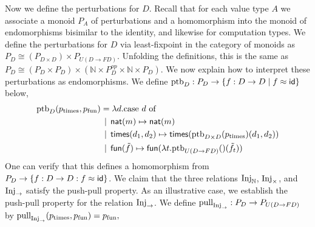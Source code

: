 Now we define the perturbations for $D$. Recall that for each value type $A$ we
associate a monoid $P_A$ of perturbations and a homomorphism into the monoid of
endomorphisms bisimilar to the identity, and likewise for computation types. We
define the perturbations for $D$ via least-fixpoint in the category of monoids
as
%
\( P_D \cong (P_{D \times D}) \times P_{U(D \to FD)}. \)
%
Unfolding the definitions, this is the same as
%
\( P_D \cong (P_D \times P_D) \times (\mathbb{N} \times P_D^{op} \times \mathbb{N} \times P_D). \)
%
We now explain how to interpret these perturbations as endomorphisms.
We define $\text{ptb}_D : P_D \to \{ f : D \to D \mid f \approx \mathsf{id} \}$ below,
%
%
\begin{align*}
 \text{ptb}_D(p_{\text{times}}, p_{\text{fun}}) &= \lambda d.\text{case $d$ of}  \\
 &\mathrel{\bf \,\mid\,} \mathsf{nat}(m) \mapsto \mathsf{nat}(m) \\
    &\mathrel{\bf \,\mid\,} \mathsf{times}(d_1, d_2) \mapsto {\mathsf{times}(\text{ptb}_{D \times D}(p_\text{times})(d_1, d_2))} \\
    &\mathrel{\bf \,\mid\,} \mathsf{fun}(\tilde{f}) \mapsto {\mathsf{fun}(\lambda t. \text{ptb}_{U(D \to FD)}()(\tilde{f}_t))}
\end{align*}
One can verify that this defines a homomorphism from $P_D \to \{ f : D \to D : f \approx \mathsf{id} \}$.
We claim that the three relations $\text{Inj}_\mathbb{N}$, $\text{Inj}_\times$, and $\text{Inj}_\to$
satisfy the push-pull property.
As an illustrative case, we establish the push-pull property for the relation $\text{Inj}_\to$.
We define $\text{pull}_{\text{Inj}_\to} : P_D \to P_{U(D \to FD)}$ by \( \text{pull}_{\text{Inj}_\to}(p_{\text{times}}, p_{\text{fun}}) = p_{\text{fun}}, \)
